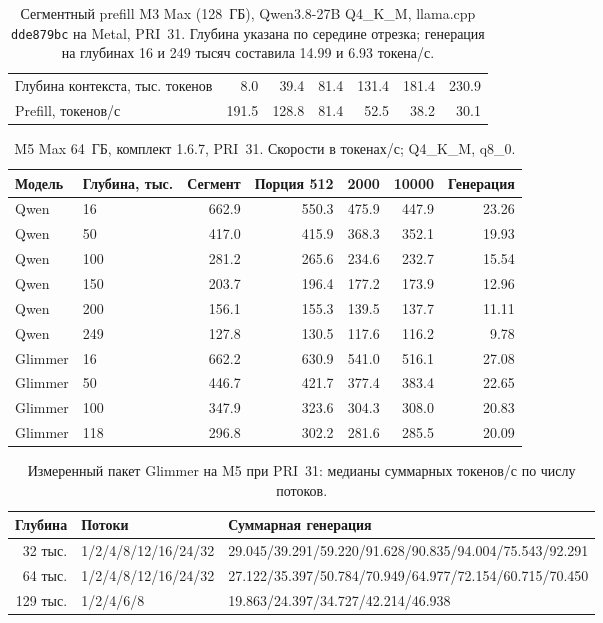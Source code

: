 \begin{table}[t]
\centering
\caption{Сегментный prefill M3 Max (128~ГБ), Qwen3.8-27B Q4\_K\_M,
llama.cpp \texttt{dde879bc} на Metal, PRI~31. Глубина указана по середине отрезка;
генерация на глубинах 16 и 249 тысяч составила 14.99 и 6.93 токена/с.}
\label{tab:m3max-methods}
\footnotesize
\begin{tabular}{lrrrrrr}
\toprule
Глубина контекста, тыс. токенов & 8.0 & 39.4 & 81.4 & 131.4 & 181.4 & 230.9 \\
Prefill, токенов/с & 191.5 & 128.8 & 81.4 & 52.5 & 38.2 & 30.1 \\
\bottomrule
\end{tabular}
\end{table}

\begin{table}[t]
\centering
\caption{M5 Max 64~ГБ, комплект 1.6.7, PRI~31. Скорости в токенах/с; Q4\_K\_M, q8\_0.}
\label{tab:m5-pri31-ladder-methods}
\footnotesize
\begin{tabular}{llrrrrr}
\toprule
Модель & Глубина, тыс. & Сегмент & Порция 512 & 2000 & 10000 & Генерация \\
\midrule
Qwen & 16 & 662.9 & 550.3 & 475.9 & 447.9 & 23.26 \\
Qwen & 50 & 417.0 & 415.9 & 368.3 & 352.1 & 19.93 \\
Qwen & 100 & 281.2 & 265.6 & 234.6 & 232.7 & 15.54 \\
Qwen & 150 & 203.7 & 196.4 & 177.2 & 173.9 & 12.96 \\
Qwen & 200 & 156.1 & 155.3 & 139.5 & 137.7 & 11.11 \\
Qwen & 249 & 127.8 & 130.5 & 117.6 & 116.2 & 9.78 \\
Glimmer & 16 & 662.2 & 630.9 & 541.0 & 516.1 & 27.08 \\
Glimmer & 50 & 446.7 & 421.7 & 377.4 & 383.4 & 22.65 \\
Glimmer & 100 & 347.9 & 323.6 & 304.3 & 308.0 & 20.83 \\
Glimmer & 118 & 296.8 & 302.2 & 281.6 & 285.5 & 20.09 \\
\bottomrule
\end{tabular}
\end{table}

\begin{table}[t]
\centering
\caption{Измеренный пакет Glimmer на M5 при PRI~31: медианы суммарных токенов/с по числу потоков.}
\label{tab:m5-glimmer-parallel-methods}
\footnotesize
\begin{tabular}{rll}
\toprule
Глубина & Потоки & Суммарная генерация \\
\midrule
32 тыс. & 1/2/4/8/12/16/24/32 & 29.045/39.291/59.220/91.628/90.835/94.004/75.543/92.291 \\
64 тыс. & 1/2/4/8/12/16/24/32 & 27.122/35.397/50.784/70.949/64.977/72.154/60.715/70.450 \\
129 тыс. & 1/2/4/6/8 & 19.863/24.397/34.727/42.214/46.938 \\
\bottomrule
\end{tabular}
\end{table}

